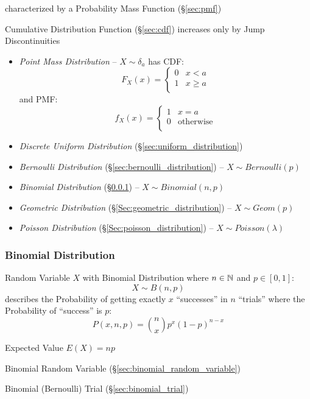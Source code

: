 characterized by a Probability Mass Function (\S\ref{sec:pmf})

Cumulative Distribution Function (\S\ref{sec:cdf}) increases only by Jump
Discontinuities

\begin{itemize}
  \item \emph{Point Mass Distribution} -- $X \sim \delta_a$ has CDF:
    \[
      F_X(x) = \begin{cases}
        0 & x <    a \\
        1 & x \geq a \\
      \end{cases}
    \]
    and PMF:
    \[
      f_X(x) = \begin{cases}
        1 & x = a \\
        0 & \text{otherwise} \\
      \end{cases}
    \]
  \item \emph{Discrete Uniform Distribution} (\S\ref{sec:uniform_distribution})
  \item \emph{Bernoulli Distribution} (\S\ref{sec:bernoulli_distribution}) --
    $X \sim Bernoulli(p)$
  \item \emph{Binomial Distribution} (\S\ref{sec:binomial_distribution}) --
    $X \sim Binomial(n,p)$
  \item \emph{Geometric Distribution} (\S\ref{Sec:geometric_distribution}) --
    $X \sim Geom(p)$
  \item \emph{Poisson Distribution} (\S\ref{Sec:poisson_distribution}) --
    $X \sim Poisson(\lambda)$
\end{itemize}



\subsubsection{Binomial Distribution}\label{sec:binomial_distribution}

Random Variable $X$ with Binomial Distribution where $n \in \mathbb{N}$ and
$p \in [0,1]$:
\[
  X \sim B(n,p)
\]
describes the Probability of getting exactly $x$ ``successes'' in $n$ ``trials''
where the Probability of ``success'' is $p$:
\[
  P(x,n,p) = \binom{n}{x}p^x(1-p)^{n-x}
\]

Expected Value $E(X) = np$

Binomial Random Variable (\S\ref{sec:binomial_random_variable})

Binomial (Bernoulli) Trial (\S\ref{sec:binomial_trial})

